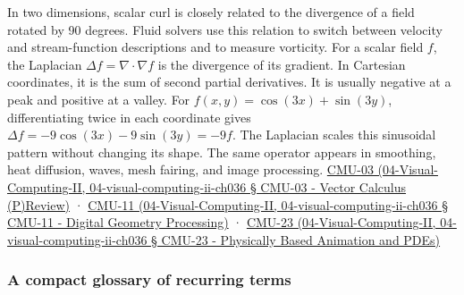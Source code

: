 In two dimensions, scalar curl is closely related to the divergence of a field rotated by 90 degrees. Fluid solvers use this relation to switch between velocity and stream-function descriptions and to measure vorticity. For a scalar field \(f\), the Laplacian \(\Delta f=\nabla\cdot\nabla f\) is the divergence of its gradient. In Cartesian coordinates, it is the sum of second partial derivatives. It is usually negative at a peak and positive at a valley. For \(f(x,y)=\cos(3x)+\sin(3y)\), differentiating twice in each coordinate gives \(\Delta f=-9\cos(3x)-9\sin(3y)=-9f\). The Laplacian scales this sinusoidal pattern without changing its shape. The same operator appears in smoothing, heat diffusion, waves, mesh fairing, and image processing. \href{}{CMU-03 (04-Visual-Computing-II, 04-visual-computing-ii-ch036 § CMU-03 - Vector Calculus (P)Review)} · \href{}{CMU-11 (04-Visual-Computing-II, 04-visual-computing-ii-ch036 § CMU-11 - Digital Geometry Processing)} · \href{}{CMU-23 (04-Visual-Computing-II, 04-visual-computing-ii-ch036 § CMU-23 - Physically Based Animation and PDEs)}

\subsubsection{A compact glossary of recurring terms}\label{a-compact-glossary-of-recurring-terms}


